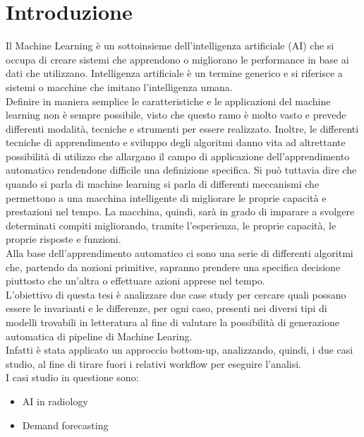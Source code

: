 \documentclass[12pt,a4paper]{report}
\begin{document}
\chapter{Introduzione}
\par
Il Machine Learning è un sottoinsieme dell'intelligenza artificiale (AI) che si occupa di creare sistemi che apprendono o migliorano le performance in base ai dati che utilizzano. Intelligenza artificiale è un termine generico e si riferisce a sistemi o macchine che imitano l'intelligenza umana.\\
Definire in maniera semplice le caratteristiche e le applicazioni del machine learning non è sempre possibile, visto che questo ramo è molto vasto e prevede differenti modalità, tecniche e strumenti per essere realizzato. Inoltre, le differenti tecniche di apprendimento e sviluppo degli algoritmi danno vita ad altrettante possibilità di utilizzo che allargano il campo di applicazione dell’apprendimento automatico rendendone difficile una definizione specifica. Si può tuttavia dire che quando si parla di machine learning si parla di differenti meccanismi che permettono a una macchina intelligente di migliorare le proprie capacità e prestazioni nel tempo. La macchina, quindi, sarà in grado di imparare a svolgere determinati compiti migliorando, tramite l’esperienza, le proprie capacità, le proprie risposte e funzioni.\\
Alla base dell’apprendimento automatico ci sono una serie di differenti algoritmi che, partendo da nozioni primitive, sapranno prendere una specifica decisione piuttosto che un’altra o effettuare azioni apprese nel tempo.\\
L'obiettivo di questa tesi è analizzare due case study per cercare quali possano essere le invarianti e le differenze, per ogni caso, presenti nei diversi tipi di modelli trovabili in letteratura al fine di valutare la possibilità di generazione automatica di pipeline di Machine Learing.\\
Infatti è stata applicato un approccio bottom-up, analizzando, quindi, i due casi studio, al fine di tirare fuori i relativi workflow per eseguire l'analisi.\\
I casi studio in questione sono:
\begin{itemize}
    \item AI in radiology
    \item Demand forecasting
\end{itemize}
\end{document}
